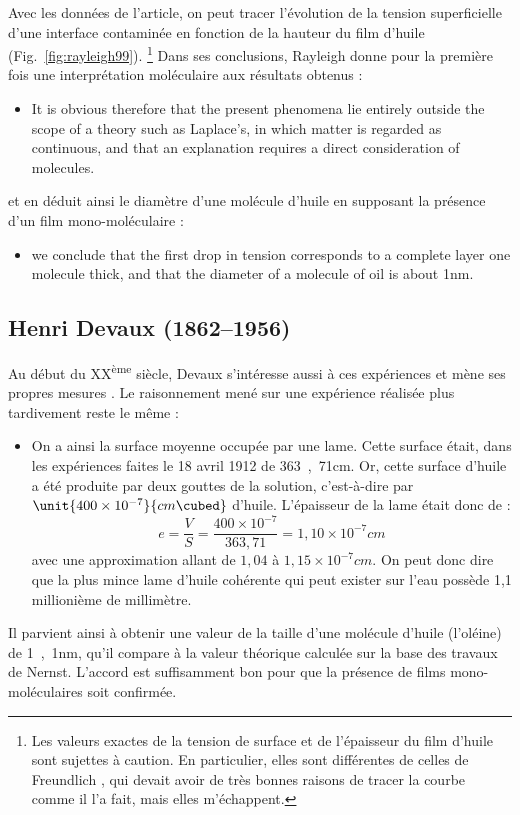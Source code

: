 \documentclass[12pt,a4paper]{article}
\begin{document}
Avec les données de l'article, on peut tracer l'évolution de la tension superficielle d'une interface contaminée en fonction de la hauteur du film d'huile (Fig.~\ref{fig:rayleigh99}).
\footnote{Les valeurs exactes de la tension de surface et de l'épaisseur du film d'huile sont sujettes à caution.
En particulier, elles sont différentes de celles de Freundlich \cite{Freundlich1909}, qui devait avoir de très bonnes raisons de tracer la courbe comme il l'a fait, mais elles m'échappent.}
Dans ses conclusions, Rayleigh donne pour la première fois une interprétation moléculaire aux résultats obtenus :
\begin{itemize}
\item[]
\og 
It is obvious therefore that the present phenomena lie entirely outside the scope of a theory such as Laplace's, in which matter is regarded as continuous, and that an explanation requires a direct consideration of molecules.
\fg{} 
\end{itemize}
et en déduit ainsi le diamètre d'une molécule d'huile en supposant la présence d'un film mono-moléculaire :
\begin{itemize}
\item[]
\og 
[...] we conclude that the first drop in tension corresponds to a complete layer one molecule thick, and that the diameter of a molecule of oil is about \unit{1}{nm}.
\fg{} 
\end{itemize}

\subsection{Henri Devaux (1862--1956)}

Au début du XX\textsuperscript{ème} siècle, Devaux s'intéresse aussi à ces expériences et mène ses propres mesures \cite{Devaux1904}.
Le raisonnement mené sur une expérience réalisée plus tardivement reste le même \cite{Devaux1931} :
\begin{itemize}
\item[]
\og On a ainsi la surface moyenne occupée par une lame.
Cette surface était, dans les expériences faites le 18 avril 1912 de \unit{363{,}71}{cm\squared}.
Or, cette surface d'huile a été produite par deux gouttes de la solution, c'est-à-dire par $\unit{400\times10^{-7}}{cm\cubed}$ d'huile.
L'épaisseur de la lame était donc de :
\[
e = \frac{V}{S} = \frac{400\times10^{-7}}{363{,}71} = \unit{1{,}10\times10^{-7}}{cm}
\]
avec une approximation allant de $1{,}04$ à $\unit{1{,}15\times10^{-7}}{cm}$.
On peut donc dire que la plus mince lame d'huile cohérente qui peut exister sur l'eau possède 1{,}1 millionième de millimètre.
\fg{} 
\end{itemize}
Il parvient ainsi à obtenir une valeur de la taille d'une molécule d'huile (l'oléine) de \unit{1{,}1}{nm}, qu'il compare à la valeur théorique calculée sur la base des travaux de Nernst.
L'accord est suffisamment bon pour que la présence de films mono-moléculaires soit confirmée.
\end{document}
